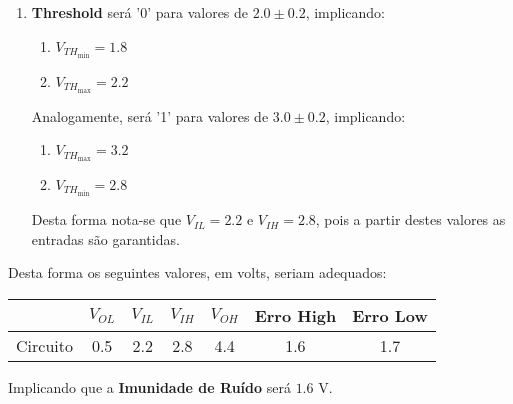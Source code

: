\documentclass{article}
\begin{document}
\begin{resolution}
\begin{enumerate}[rightmargin = \leftmargin]
                        \item \textbf{Threshold} será '0' para valores de $2.0 \pm 0.2$, implicando:
                            \begin{enumerate}[noitemsep, rightmargin = \leftmargin]
                                \item $V_{TH_{\text{min}}} = 1.8$
                                \item $V_{TH_{\text{max}}} = 2.2$
                            \end{enumerate}
                        Analogamente, será '1' para valores de $3.0 \pm 0.2$, implicando:
                            \begin{enumerate}[noitemsep, rightmargin = \leftmargin]
                                \item $V_{TH_{\text{max}}} = 3.2$
                                \item $V_{TH_{\text{min}}} = 2.8$
                            \end{enumerate}
                        Desta forma nota-se que $V_{IL} = 2.2$ e $V_{IH} = 2.8$, pois a partir destes valores as entradas são garantidas.
                    \end{enumerate}
                Desta forma os seguintes valores, em volts, seriam adequados:
                    \begin{table}[H]
                        \centering  
                        \begin{tabular}[]{l|cccc|cc}\hline
                                     & $V_{OL}$ & $V_{IL}$ & $V_{IH}$ & $V_{OH}$ & Erro High & Erro Low\\\hline
                            Circuito & 0.5      & 2.2      & 2.8      & 4.4      & 1.6       & 1.7\\\hline
                        \end{tabular}
                    \end{table}
                Implicando que a \textbf{Imunidade de Ruído} será $\boxed{1.6 \text{ V}}$.
            \end{resolution}

\newpage
\end{document}
